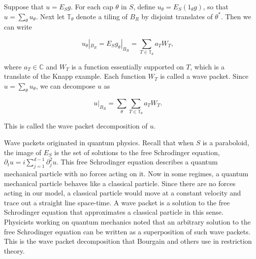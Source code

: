 \documentclass{amsart}
\newcommand{\CC}{\mathbb{C}}
\newcommand{\TT}{\mathbb{T}}
\begin{document}
Suppose that $u = E_S g$.  For each cap $\theta$ in $S$, define $u_\theta = E_S (1_\theta g)$, so that $u = \sum_{\theta} u_\theta$.  Next let $\TT_\theta$ denote a tiling of $B_R$ by disjoint translates of $\theta^*$.  Then we can write

\begin{equation} \label{wptheta} u_\theta |_{B_R} = E_S g_\theta |_{B_R} = \sum_{T \in \TT_\theta} a_T W_T, \end{equation}

\noindent where $a_T \in \CC$ and $W_T$ is a function essentially supported on $T$, which is a translate of the Knapp example.  Each function $W_T$ is called a wave packet.  Since $u = \sum_\theta u_\theta$, we can decompose $u$ as

\begin{equation}  u |_{B_R} = \sum_\theta \sum_{T \in \TT_\theta} a_T W_T. \end{equation}

\noindent This is called the wave packet decomposition of $u$.

Wave packets originated in quantum physics.  Recall that when $S$ is a paraboloid, the image of $E_S$ is the set of solutions to the free Schrodinger equation, $\partial_t u = i \sum_{j=1}^{d-1} \partial_j^2 u$.  This free Schrodinger equation describes a quantum mechanical particle with no forces acting on it.  Now in some regimes, a quantum mechanical particle behaves like a classical particle.  Since there are no forces acting in our model, a classical particle would move at a constant velocity and trace out a straight line space-time.  A wave packet is a solution to the free Schrodinger equation that approximates a classical particle in this sense.  Physicists working on quantum mechanics noted that an arbitrary solution to the free Schrodinger equation can be written as a superposition of such wave packets.  This is the wave packet decomposition that Bourgain and others use in restriction theory.
\end{document}
